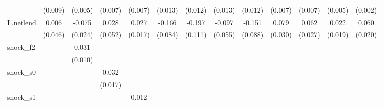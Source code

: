 {\begin{tabular}{l*{12}{c}}
            &     (0.009)         &     (0.005)         &     (0.007)         &     (0.007)         &     (0.013)         &     (0.012)         &     (0.013)         &     (0.012)         &     (0.007)         &     (0.007)         &     (0.005)         &     (0.002)         \\
\addlinespace
L.netlend   &       0.006         &      -0.075\sym{***}&       0.028         &       0.027         &      -0.166\sym{*}  &      -0.197\sym{*}  &      -0.097\sym{*}  &      -0.151\sym{*}  &       0.079\sym{**} &       0.062\sym{**} &       0.022         &       0.060\sym{***}\\
            &     (0.046)         &     (0.024)         &     (0.052)         &     (0.017)         &     (0.084)         &     (0.111)         &     (0.055)         &     (0.088)         &     (0.030)         &     (0.027)         &     (0.019)         &     (0.020)         \\
\addlinespace
shock\_f2    &                     &       0.031\sym{***}&                     &                     &                     &                     &                     &                     &                     &                     &                     &                     \\
            &                     &     (0.010)         &                     &                     &                     &                     &                     &                     &                     &                     &                     &                     \\
\addlinespace
shock\_s0    &                     &                     &       0.032\sym{*}  &                     &                     &                     &                     &                     &                     &                     &                     &                     \\
            &                     &                     &     (0.017)         &                     &                     &                     &                     &                     &                     &                     &                     &                     \\
\addlinespace
shock\_s1    &                     &                     &                     &       0.012\sym{**} &                     &                     &                     &                     &                     &                     &                     &                     \\

\end{tabular}}
